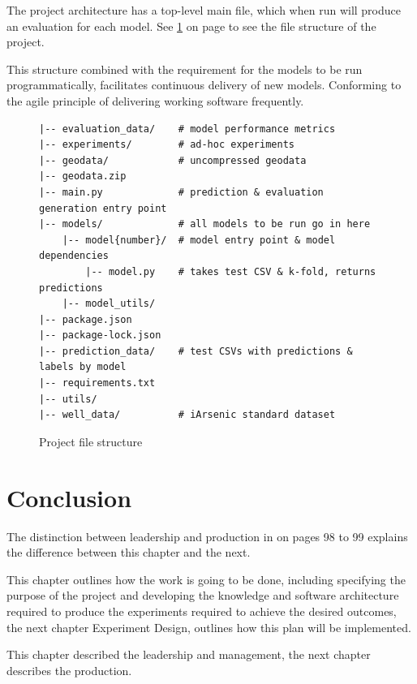 The project architecture has a top-level main file, which when run will produce an evaluation for each model. See \ref{fig:x p_fs} on page \pageref{fig:x p_fs} to see the file structure of the project.

This structure combined with the requirement for the models to be run programmatically, facilitates continuous delivery of new models. Conforming to the agile principle of delivering working software frequently.

\begin{figure}
    \begin{verbatim}
|-- evaluation_data/    # model performance metrics
|-- experiments/        # ad-hoc experiments
|-- geodata/            # uncompressed geodata
|-- geodata.zip
|-- main.py             # prediction & evaluation generation entry point
|-- models/             # all models to be run go in here
    |-- model{number}/  # model entry point & model dependencies
        |-- model.py    # takes test CSV & k-fold, returns predictions
    |-- model_utils/
|-- package.json	
|-- package-lock.json	
|-- prediction_data/    # test CSVs with predictions & labels by model
|-- requirements.txt
|-- utils/		
|-- well_data/          # iArsenic standard dataset
    \end{verbatim}
    \caption{Project file structure}
    \label{fig:x p_fs}
\end{figure}

\section{Conclusion}

The distinction between leadership and production in \cite{Covey2013} on pages 98 to 99 explains the difference between this chapter and the next. 

This chapter outlines how the work is going to be done, including specifying the purpose of the project and developing the knowledge and software architecture required to produce the experiments required to achieve the desired outcomes, the next chapter Experiment Design, outlines how this plan will be implemented.

This chapter described the leadership and management, the next chapter describes the production.